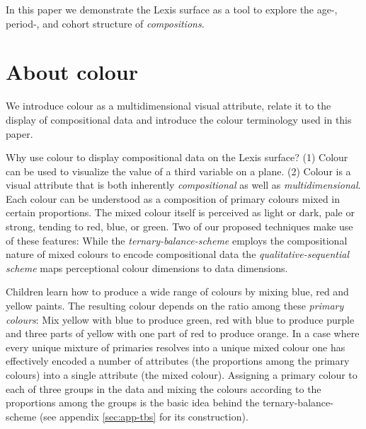 \documentclass[parskip=half]{scrartcl}
\begin{document}
In this paper we demonstrate the Lexis surface as a tool to explore the age-, period-, and cohort structure of \emph{compositions}.

\clearpage

\section{About colour} %
\label{sec:colour}

We introduce colour as a multidimensional visual attribute, relate it to the display of compositional data and introduce the colour terminology used in this paper.

Why use colour to display compositional data on the Lexis surface?
  (1) Colour can be used to visualize the value of a third variable on a plane.
  (2) Colour is a visual attribute that is both inherently \emph{compositional} as well as \emph{multidimensional}. Each colour can be understood as a composition of primary colours mixed in certain proportions. The mixed colour itself is perceived as light or dark, pale or strong, tending to red, blue, or green. Two of our proposed techniques make use of these features: While the \emph{ternary-balance-scheme} employs the compositional nature of mixed colours to encode compositional data the \emph{qualitative-sequential scheme} maps perceptional colour dimensions to data dimensions.

Children learn how to produce a wide range of colours by mixing blue, red and yellow paints. The resulting colour depends on the ratio among these \emph{primary colours}: Mix yellow with blue to produce green, red with blue to produce purple and three parts of yellow with one part of red to produce orange. In a case where every unique mixture of primaries resolves into a unique mixed colour one has effectively encoded a number of attributes (the proportions among the primary colours) into a single attribute (the mixed colour). Assigning a primary colour to each of three groups in the data and mixing the colours according to the proportions among the groups is the basic idea behind the ternary-balance-scheme (see appendix \ref{sec:app-tbs} for its construction).
\end{document}
